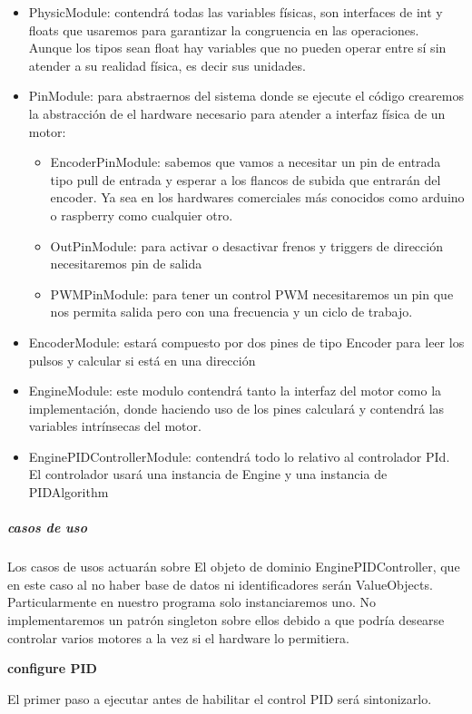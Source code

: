 \begin{itemize}
    \item PhysicModule: contendrá todas las variables físicas, son interfaces de int y floats que usaremos para garantizar la congruencia en las operaciones. Aunque los tipos sean float hay variables que no pueden operar entre sí sin atender a su realidad física, es decir sus unidades.
    \item PinModule: para abstraernos del sistema donde se ejecute el código crearemos la abstracción de el hardware necesario para atender a interfaz física de un motor:
    \begin{itemize}
        \item EncoderPinModule: sabemos que vamos a necesitar un pin de entrada tipo pull de entrada y esperar a los flancos de subida que entrarán del encoder. Ya sea en los hardwares comerciales más conocidos como arduino o raspberry como cualquier otro.
        \item OutPinModule: para activar o desactivar frenos y triggers de dirección necesitaremos pin de salida
        \item PWMPinModule: para tener un control PWM necesitaremos un pin que nos permita salida pero con una frecuencia y un ciclo de trabajo.
    \end{itemize}
    \item EncoderModule: estará compuesto por dos pines de tipo Encoder para leer los pulsos y calcular si está en una dirección
    \item EngineModule: este modulo contendrá tanto la interfaz del motor como la implementación, donde haciendo uso de los pines calculará y contendrá las variables intrínsecas del motor.
    \item EnginePIDControllerModule: contendrá todo lo relativo al controlador PId. El controlador usará una instancia de Engine y una instancia de PIDAlgorithm
\end{itemize}

\subparagraph{casos de uso}

Los casos de usos actuarán sobre El objeto de dominio EnginePIDController, que en este caso al no haber base de datos ni identificadores serán ValueObjects. Particularmente en nuestro programa solo instanciaremos uno. No implementaremos un patrón singleton sobre ellos debido a que podría desearse controlar varios motores a la vez si el hardware lo permitiera.

\textbf{configure PID}

El primer paso a ejecutar antes de habilitar el control PID será sintonizarlo.


